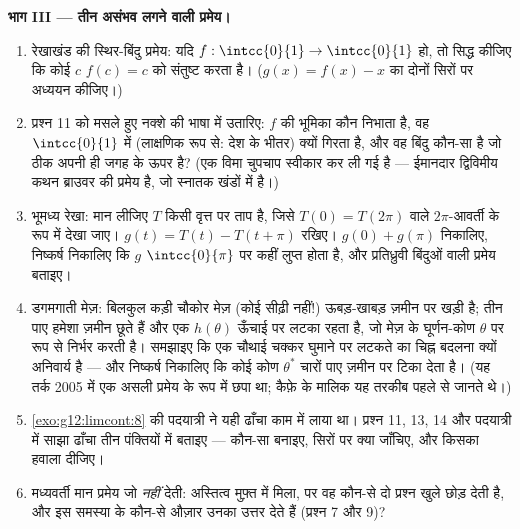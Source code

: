 \begin{problem}
\medskip
\noindent\textbf{भाग III --- तीन असंभव लगने वाली प्रमेय।}
\begin{enumerate}[resume]
  \item रेखाखंड की स्थिर-बिंदु प्रमेय: यदि $f : \intcc{0}{1} \to \intcc{0}{1}$  हो, तो सिद्ध कीजिए कि
        कोई $c$ $f(c) = c$ को संतुष्ट करता है। ($g(x) = f(x) - x$ का दोनों सिरों पर अध्ययन
        कीजिए।)
  \item प्रश्न 11 को मसले हुए नक्शे की भाषा में उतारिए: $f$ की भूमिका कौन
        निभाता है, वह $\intcc{0}{1}$ में (लाक्षणिक रूप से: देश के भीतर) क्यों गिरता
        है, और वह बिंदु कौन-सा है जो ठीक अपनी ही जगह के ऊपर है? (एक विमा
        चुपचाप स्वीकार कर ली गई है --- ईमानदार द्विविमीय कथन ब्राउवर की
        प्रमेय है, जो स्नातक खंडों में है।)
  \item भूमध्य रेखा: मान लीजिए $T$ किसी वृत्त पर  ताप है, जिसे $T(0) = T(2\pi)$
        वाले $2\pi$-आवर्ती  के रूप में देखा जाए। $g(t) = T(t) - T(t + \pi)$ रखिए। $g(0) + g(\pi)$
        निकालिए, निष्कर्ष निकालिए कि $g$ $\intcc{0}{\pi}$ पर कहीं लुप्त होता है, और
        प्रतिध्रुवी बिंदुओं वाली प्रमेय बताइए।
  \item डगमगाती मेज़: बिलकुल कड़ी चौकोर मेज़  (कोई सीढ़ी नहीं!)
        ऊबड़-खाबड़ ज़मीन पर खड़ी है; तीन पाए हमेशा ज़मीन छूते हैं और एक
        $h(\theta)$ ऊँचाई पर लटका रहता है, जो मेज़ के घूर्णन-कोण $\theta$ पर 
        रूप से निर्भर करती है। समझाइए कि एक चौथाई चक्कर घुमाने पर लटकते
         का चिह्न बदलना क्यों अनिवार्य है --- और निष्कर्ष निकालिए कि
        कोई कोण $\theta^*$ चारों पाए ज़मीन पर टिका देता है। (यह तर्क 2005 में
        एक असली प्रमेय के रूप में छपा था; कैफ़े के मालिक यह तरकीब पहले से
        जानते थे।)
  \item \cref{exo:g12:limcont:8} की पदयात्री ने यही ढाँचा काम में लाया था। प्रश्न 11, 13, 14
        और पदयात्री में साझा ढाँचा तीन पंक्तियों में बताइए --- कौन-सा 
        बनाइए, सिरों पर क्या जाँचिए, और किसका हवाला दीजिए।
  \item मध्यवर्ती मान प्रमेय जो \emph{नहीं} देती: अस्तित्व मुफ़्त में मिला,
        पर वह कौन-से दो प्रश्न खुले छोड़ देती है, और इस समस्या के कौन-से
        औज़ार उनका उत्तर देते हैं (प्रश्न 7 और 9)?
\end{enumerate}


\end{problem}
